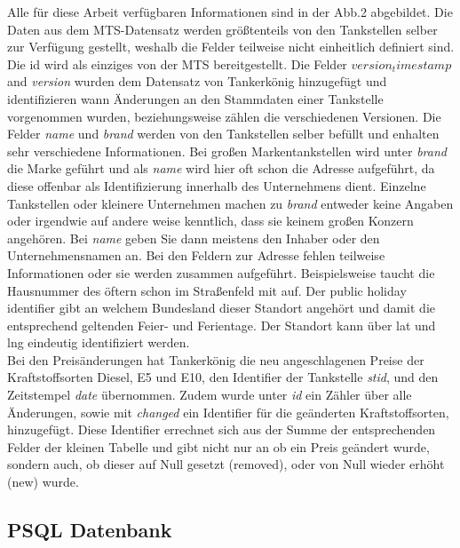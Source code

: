 \documentclass[12pt,a4paper,bibliography=totocnumbered,listof=totocnumbered]{scrartcl}
\begin{document}
Alle für diese Arbeit verfügbaren Informationen sind in der Abb.2 abgebildet. Die Daten aus dem MTS-Datensatz werden größtenteils von den Tankstellen selber zur Verfügung gestellt, weshalb die Felder teilweise nicht einheitlich definiert sind. Die id wird als einziges von der MTS bereitgestellt. Die Felder \textit{$version_timestamp$} and \textit{version} wurden dem Datensatz von Tankerkönig hinzugefügt und identifizieren wann Änderungen an den Stammdaten einer Tankstelle vorgenommen wurden, beziehungsweise zählen die verschiedenen Versionen. Die Felder \textit{name} und \textit{brand} werden von den Tankstellen selber befüllt und enhalten sehr verschiedene Informationen. Bei großen Markentankstellen wird unter \textit{brand} die Marke geführt und als \textit{name} wird hier oft schon die Adresse aufgeführt, da diese offenbar als Identifizierung innerhalb des Unternehmens dient. Einzelne Tankstellen oder kleinere Unternehmen machen zu \textit{brand} entweder keine Angaben oder irgendwie auf andere weise kenntlich, dass sie keinem großen Konzern angehören. Bei \textit{name} geben Sie dann meistens den Inhaber oder den Unternehmensnamen an. Bei den Feldern zur Adresse fehlen teilweise Informationen oder sie werden zusammen aufgeführt. Beispielsweise taucht die Hausnummer des öftern schon im Straßenfeld mit auf. Der public holiday identifier gibt an welchem Bundesland dieser Standort angehört und damit die entsprechend geltenden Feier- und Ferientage. Der Standort kann über lat und lng eindeutig identifiziert werden.\\
Bei den Preisänderungen hat Tankerkönig die neu angeschlagenen Preise der Kraftstoffsorten Diesel, E5 und E10, den Identifier der Tankstelle \textit{stid}, und den Zeitstempel \textit{date} übernommen. Zudem wurde unter \textit{id} ein Zähler über alle Änderungen, sowie mit \textit{changed} ein Identifier für die geänderten Kraftstoffsorten, hinzugefügt. Diese Identifier errechnet sich aus der Summe der entsprechenden Felder der kleinen Tabelle und gibt nicht nur an ob ein Preis geändert wurde, sondern auch, ob dieser auf Null gesetzt (removed), oder von Null wieder erhöht (new) wurde.\\

\subsection{PSQL Datenbank}
\end{document}
